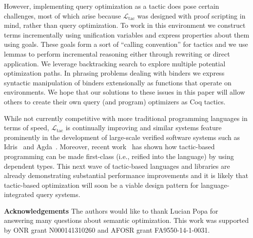 \documentclass{sigplanconf}
\newcommand{\ltac}[0]{\ensuremath{\mathcal{L}_{\mathrm{tac}}}}
\begin{document}
However, implementing query optimization as a tactic does pose certain challenges, most of which arise because \ltac{} was designed with proof scripting in mind, rather than query optimization.
To work in this environment we construct terms incrementally using unification variables and express properties about them using goals.
These goals form a sort of ``calling convention'' for tactics and we use lemmas to perform incremental reasoning either through rewriting or direct application.
We leverage backtracking search to explore multiple potential optimization paths.
In phrasing problems dealing with binders we express syntactic manipulation of binders extensionally as functions that operate on environments.
We hope that our solutions to these issues in this paper will allow others to create their own query (and program) optimizers as Coq tactics.

While not currently competitive with more traditional programming languages in terms of speed, \ltac{} is continually improving and similar systems feature prominently in the development of large-scale verified software systems such as Idris~\cite{brady2013idris} and Agda~\cite{agda}.  Moreover, recent work~\cite{malecha2015thesis,devriese2013tsmp,vanderwalt2013engineering-reflection-agda} has shown how tactic-based programming can be made first-class (i.e., reified into the language) by using dependent types.
This next wave of tactic-based languages and libraries are already demonstrating substantial performance improvements and it is likely that tactic-based optimization will soon be a viable design pattern for language-integrated query systems.






{\bf Acknowledgements}  The authors would like to thank Lucian Popa for answering many questions about semantic optimization.  This work was supported by ONR grant N000141310260 and AFOSR grant FA9550-14-1-0031.



\end{document}
